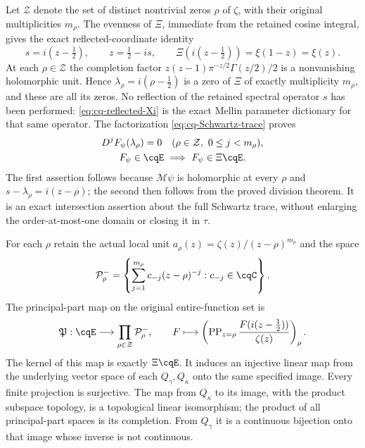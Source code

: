 Let $\mathcal Z$ denote the set of distinct nontrivial zeros $\rho$
of $\zeta$, with their original multiplicities $m_\rho$.
The evenness of $\Xi$, immediate from the retained cosine integral,
gives the exact reflected-coordinate identity
\begin{equation}\label{eq:cq-reflected-Xi}
 s=i(z-\tfrac12),\qquad z=\tfrac12-is,\qquad
 \Xi(i(z-\tfrac12))=\xi(1-z)=\xi(z).
\end{equation}
At each $\rho\in\mathcal Z$ the completion factor
$z(z-1)\pi^{-z/2}\Gamma(z/2)/2$ is a nonvanishing holomorphic
unit. Hence $\lambda_\rho=i(\rho-\tfrac12)$ is a zero of
$\Xi$ of exactly multiplicity $m_\rho$, and these are all its
zeros. No reflection of the retained spectral operator $s$ has
been performed: \eqref{eq:cq-reflected-Xi} is the exact Mellin
parameter dictionary for that same operator. The factorization
\eqref{eq:cq-Schwartz-trace} proves
\begin{equation}\label{eq:cq-fulltrace-jets}
 \begin{gathered}
 D^jF_\psi(\lambda_\rho)=0
 \quad(\rho\in\mathcal Z,\ 0\leq j<m_\rho),\\
 F_\psi\in\cqE\ \Longrightarrow\ F_\psi\in\Xi\cqE.
 \end{gathered}
\end{equation}
The first assertion follows because $\mathcal M\psi$ is holomorphic
at every $\rho$ and $s-\lambda_\rho=i(z-\rho)$; the second
then follows from the proved division theorem. It is an exact
intersection assertion about the full Schwartz trace, without
enlarging the order-at-most-one domain or closing it in $\tau$.

For each $\rho$ retain the actual local unit
$a_\rho(z)=\zeta(z)/(z-\rho)^{m_\rho}$ and the space
\[
 \mathcal P_\rho^-=
  \left\{\sum_{j=1}^{m_\rho}c_{-j}(z-\rho)^{-j}:c_{-j}\in\cqC\right\}.
\]
The principal-part map on the original entire-function set is
\begin{equation}\label{eq:cq-principalparts}
 \mathfrak P:\cqE\longrightarrow\prod_{\rho\in\mathcal Z}\mathcal P_\rho^-,
 \qquad
 F\longmapsto\left(\operatorname{PP}_{z=\rho}
                 \frac{F(i(z-\tfrac12))}{\zeta(z)}\right)_\rho.
\end{equation}
The kernel of this map is exactly $\Xi\cqE$. It induces an
injective linear map from the underlying vector space of each
$Q_\gamma,Q_\kappa$ onto the same specified image. Every finite
projection is surjective. The map from $Q_\kappa$ to its image,
with the product subspace topology, is a topological linear
isomorphism; the product of all principal-part spaces is its
completion. From $Q_\gamma$ it is a continuous bijection onto
that image whose inverse is not continuous.

